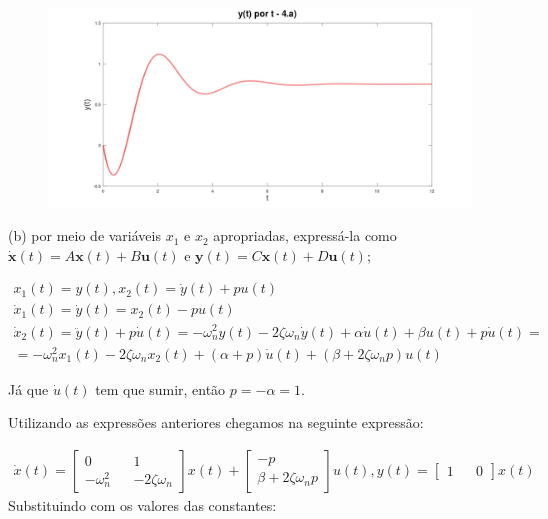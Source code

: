 \documentclass[10pt]{article}
\newcommand{\bm}[1]{\boldsymbol{#1}}
\begin{document}
\begin{figure}[h]
    \includegraphics[scale=0.15]{questao4a.jpg}
    \centering
\end{figure}

\vspace{\baselineskip}

(b) por meio de variáveis $x_1$ e $x_2$ apropriadas, expressá-la como $\dot{\bm{x}}(t) = A\bm{x}(t) + B\bm{u}(t)$ e $\bm{y}(t) = C\bm{x}(t) + D\bm{u}(t)$;

\begin{align*}
    x_1(t) = y(t), x_2(t) = \dot{y}(t) + pu(t) \\
    \dot{x}_1(t) = \dot{y}(t) = x_2(t) - pu(t) \\
    \dot{x}_2(t) = \ddot{y}(t) + p\dot{u}(t) =  - \omega_n^2 y(t) - 2\zeta \omega_n \dot{y}(t) + \alpha \dot{u}(t) + \beta u(t)+  p \dot{u}(t) = \\
    = - \omega_n^2 x_1(t) -2\zeta \omega_n x_2(t) + (\alpha + p)\dot{u}(t) + (\beta + 2\zeta\omega_n p)u(t) 
\end{align*}

Já que $\dot{u}(t)$ tem que sumir, então $p = - \alpha = 1$.

\vspace{\baselineskip}

Utilizando as expressões anteriores chegamos na seguinte expressão:

\begin{align*}
    \dot{x}(t) =
    \begin{bmatrix}
        0 && 1 \\
        -\omega_n^2 && -2\zeta\omega_n
    \end{bmatrix}
    x(t) +
    \begin{bmatrix}
        -p \\
        \beta + 2 \zeta\omega_n p
    \end{bmatrix}
    u(t), y(t) =
    \begin{bmatrix}
        1 && 0
    \end{bmatrix}
    x(t)
\end{align*}
Substituindo com os valores das constantes:
\end{document}
